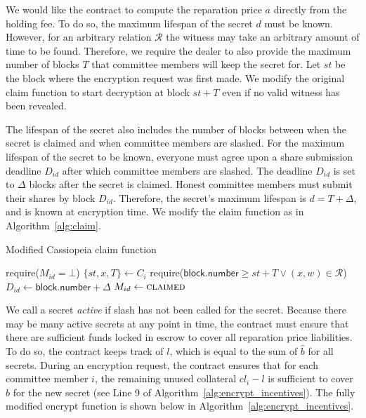 We would like the contract to compute the reparation price $a$ directly from the holding fee.
To do so, the maximum lifespan of the secret $d$ must be known.
However, for an arbitrary relation $\mathcal{R}$ the witness may take an arbitrary amount of time to be found.
Therefore, we require the dealer to also provide the maximum number of blocks $T$ that committee members will keep the secret for.
Let $st$ be the block where the encryption request was first made.
We modify the original \textsf{claim} function to start decryption at block $st + T$ even if no valid witness has been revealed.

The lifespan of the secret also includes the number of blocks between when the secret is claimed and when committee members are slashed.
For the maximum lifespan of the secret to be known, everyone must agree upon a share submission deadline $D_{id}$ after which committee members are slashed.
The deadline $D_{id}$ is set to $\Delta$ blocks after the secret is claimed.
Honest committee members must submit their shares by block $D_{id}$.
Therefore, the secret's maximum lifespan is $d = T + \Delta$, and is known at encryption time.
We modify the \textsf{claim} function as in Algorithm~\ref{alg:claim}.

\begin{algorithm}[h]
\caption{Modified Cassiopeia \textsf{claim} function}
\label{alg:claim}
    \begin{algorithmic}[1]
                \State require($M_{id} = \bot$)
                \State $\{st, x, T\} \gets C_i$
                \State require($\textsf{block.number} \geq st + T \lor (x, w) \in \mathcal{R}$)
                \State $D_{id} \gets \textsf{block.number} + \Delta$
                \State $M_{id} \gets \textsc{claimed}$
            \EndFunction
    \end{algorithmic}
\end{algorithm}

We call a secret \emph{active} if \textsf{slash} has not been called for the secret.
Because there may be many active secrets at any point in time, the contract must ensure that there are sufficient funds locked in escrow to cover all reparation price liabilities.
To do so, the contract keeps track of $l$, which is equal to the sum of $\hat{b}$ for all secrets.
During an encryption request, the contract ensures that for each committee member $i$, the remaining unused collateral $cl_i - l$ is sufficient to cover $\hat{b}$ for the new secret (see Line 9 of Algorithm~\ref{alg:encrypt_incentives}).
The fully modified \textsf{encrypt} function is shown below in Algorithm~\ref{alg:encrypt_incentives}.

